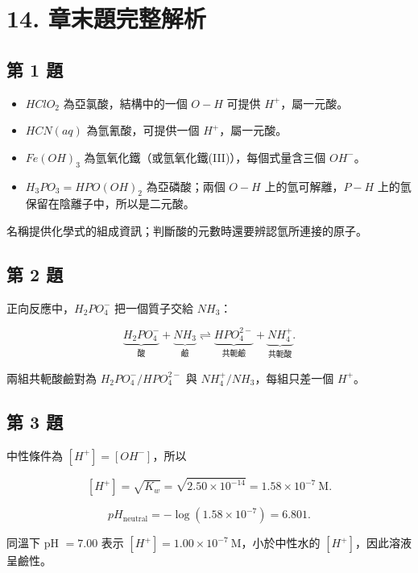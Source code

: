 \documentclass[11pt,a4paper]{article}
\providecommand{\tightlist}{%
  \setlength{\itemsep}{0pt}\setlength{\parskip}{0pt}}
\begin{document}
\section{14. 章末題完整解析}\label{ux7ae0ux672bux984cux5b8cux6574ux89e3ux6790}

\subsection{第 1 題}\label{ux7b2c-1-ux984c}

\begin{itemize}
\tightlist
\item
  \(HClO_2\) 為亞氯酸，結構中的一個 \(O-H\) 可提供 \(H^+\)，屬一元酸。
\item
  \(HCN(aq)\) 為氫氰酸，可提供一個 \(H^+\)，屬一元酸。
\item
  \(Fe(OH)_3\) 為氫氧化鐵（或氫氧化鐵(III)），每個式量含三個 \(OH^-\)。
\item
  \(H_3PO_3=HPO(OH)_2\) 為亞磷酸；兩個 \(O-H\) 上的氫可解離，\(P-H\) 上的氫保留在陰離子中，所以是二元酸。
\end{itemize}

名稱提供化學式的組成資訊；判斷酸的元數時還要辨認氫所連接的原子。

\subsection{第 2 題}\label{ux7b2c-2-ux984c}

正向反應中，\(H_2PO_4^-\) 把一個質子交給 \(NH_3\)：

\[
\underbrace{H_2PO_4^-}_{\text{酸}}+
\underbrace{NH_3}_{\text{鹼}}
\rightleftharpoons
\underbrace{HPO_4^{2-}}_{\text{共軛鹼}}+
\underbrace{NH_4^+}_{\text{共軛酸}}.
\]

兩組共軛酸鹼對為 \(H_2PO_4^-/HPO_4^{2-}\) 與 \(NH_4^+/NH_3\)，每組只差一個 \(H^+\)。

\subsection{第 3 題}\label{ux7b2c-3-ux984c}

中性條件為 \([H^+]=[OH^-]\)，所以

\[
[H^+]=\sqrt{K_w}=\sqrt{2.50\times10^{-14}}
=1.58\times10^{-7}\ \mathrm M.
\]

\[
pH_{\mathrm{neutral}}=-\log(1.58\times10^{-7})=6.801.
\]

同溫下 pH \(=7.00\) 表示 \([H^+]=1.00\times10^{-7}\ \mathrm M\)，小於中性水的 \([H^+]\)，因此溶液呈鹼性。
\end{document}

